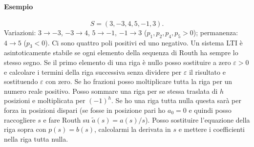 \paragraph{Esempio}
\[
S=(3,-3,4,5,-1,3).
\]
Variazioni: $3\to-3$, $-3\to4$, $5\to-1$, $-1\to3$ ($p_1,p_2,p_4,p_5>0$); permanenza: $4\to5$ ($p_3<0$).
Ci sono quattro poli positivi ed uno negativo.
Un sistema LTI è asintoticamente stabile se ogni elemento della sequenza di Routh ha sempre lo stesso segno.
Se il primo elemento di una riga è nullo posso sostituire a zero $\varepsilon>0$ e calcolare i termini della riga successiva senza dividere per $\varepsilon$ il risultato e sostituendo $\varepsilon$ con zero.
Se ho frazioni posso moltiplicare tutta la riga per un numero reale positivo.
Posso sommare una riga per se stessa traslata di $h$ posizioni e moltiplicata per $(-1)^h$.
Se ho una riga tutta nulla questa sarà per forza in posizioni dispari (se fosse in posizione pari ho $a_0=0$ e quindi posso raccogliere $s$ e fare Routh su $\widetilde a(s)=a(s)/s$).
Posso sostituire l'equazione della riga sopra con $p(s)=b(s)$, calcolarmi la derivata in $s$ e mettere i coefficienti nella riga tutta nulla.
